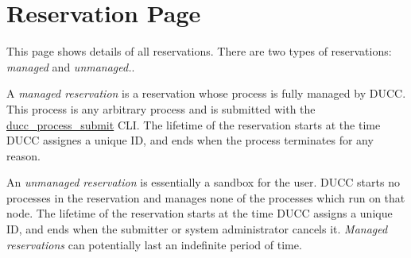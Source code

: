 
\section{Reservation Page}
\label{sec:ws-reservations}

This page shows details of all reservations.  There are two types of reservations: {\em managed}
and {\em unmanaged.}.

A {\em managed reservation} is a reservation whose process is fully managed by DUCC.  This process
is any arbitrary process and is submitted with the
\hyperref[sec:cli.ducc-process-submit]{ducc\_process\_submit} CLI.  The lifetime of the reservation
starts at the time DUCC assignes a unique ID, and ends when the process terminates for any reason.

An {\em unmanaged reservation} is essentially a sandbox for the user.  DUCC starts no processes
in the reservation and manages none of the processes which run on that node.  The lifetime of the
reservation starts at the time DUCC assigns a unique ID, and ends when the submitter or system
administrator cancels it.  {\em Managed reservations} can potentially last an indefinite
period of time.

